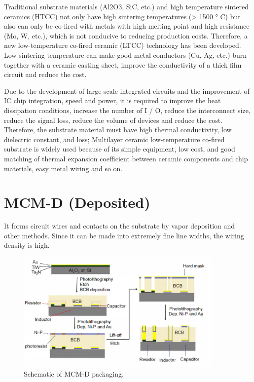 \begin{spacing}{1.5}
Traditional substrate materials (Al2O3, SiC, etc.) and high temperature sintered ceramics (HTCC) not only have high sintering temperatures (> 1500 ° C) but also can only be co-fired with metals with high melting point and high resistance (Mo, W, etc.), which is not conducive to reducing production costs. Therefore, a new low-temperature co-fired ceramic (LTCC) technology has been developed. Low sintering temperature can make good metal conductors (Cu, Ag, etc.) burn together with a ceramic casting sheet, improve the conductivity of a thick film circuit and reduce the cost.

Due to the development of large-scale integrated circuits and the improvement of IC chip integration, speed and power, it is required to improve the heat dissipation conditions, increase the number of I / O, reduce the interconnect size, reduce the signal loss, reduce the volume of devices and reduce the cost. Therefore, the substrate material must have high thermal conductivity, low dielectric constant, and loss; Multilayer ceramic low-temperature co-fired substrate is widely used because of its simple equipment, low cost, and good matching of thermal expansion coefficient between ceramic components and chip materials, easy metal wiring and so on.

\section{MCM-D (Deposited)}

It forms circuit wires and contacts on the substrate by vapor deposition and other methods. Since it can be made into extremely fine line widths, the wiring density is high. 

\begin{figure}[ht]
	\centering
	\includegraphics[width=4in, fbox]{Chapter3/3.eps}
	\caption{Schematic of MCM-D packaging.}
	\label{fig:chpt3.3} 
\end{figure}


\end{spacing}
